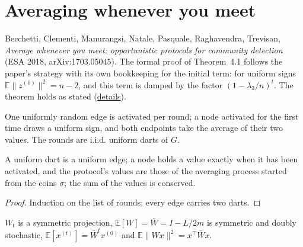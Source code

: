 \section{Averaging whenever you meet}\label{sec:bcmnprt-opportunistic}
Becchetti, Clementi, Manurangsi, Natale, Pasquale, Raghavendra, Trevisan, \emph{Average whenever
you meet: opportunistic protocols for community detection} (ESA 2018, arXiv:1703.05045).
The formal proof of Theorem~4.1 follows the paper's strategy with its own bookkeeping for the
initial term: for uniform signs $\mathbb E\|z^{(0)}\|^2=n-2$, and this term is damped by the
factor $(1-\lambda_3/n)^t$. The theorem holds as stated
(\href{https://github.com/formal-dynamics/leanamics/blob/main/averaging/FORMALIZATION_DIFFERENCES.md#averaging-whenever-you-meet-opportunistic-avg-3}{details}).
\begin{definition}\label{def:opp}
\leanok
One uniformly random edge is activated per round; a node activated for the first time draws a
uniform sign, and both endpoints take the average of their two values. The rounds are i.i.d.
uniform darts of $G$.
\end{definition}
\begin{lemma}\label{lem:opp-model}
\leanok{}
A uniform dart is a uniform edge; a node holds a value exactly when it has been activated, and
the protocol's values are those of the averaging process started from the coins $\sigma$; the sum
of the values is conserved.
\end{lemma}
\begin{proof}\leanok
Induction on the list of rounds; every edge carries two darts.
\end{proof}
\begin{theorem}\label{thm:opp-first}
\leanok{}
$W_t$ is a symmetric projection, $\mathbb E[W]=\bar W=I-L/2m$ is symmetric and doubly stochastic,
$\mathbb E[x^{(t)}]=\bar W^tx^{(0)}$ and $\mathbb E\|Wx\|^2=x^\top\bar Wx$.
\end{theorem}

